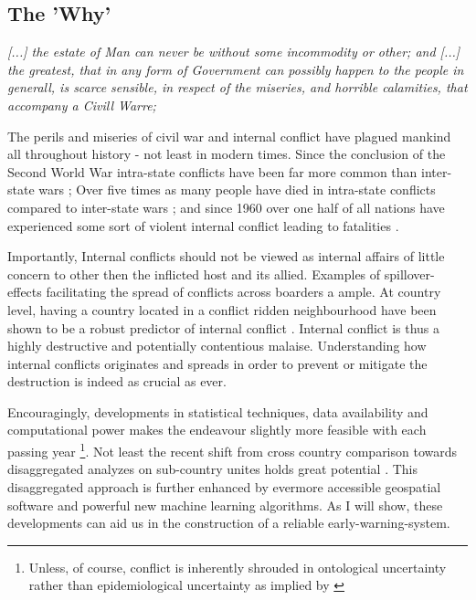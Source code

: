 \documentclass[a4paper]{article}
\begin{document}
\subsection{The 'Why'}

\begin{displayquote}
\emph{[...] the estate of Man can never be without some incommodity or other; and [...] the greatest, that in any form of Government can possibly happen to the people in generall, is scarce sensible, in respect of the miseries, and horrible calamities, that accompany a Civill Warre;} \cite[128]{Hobbes_1991} \par

\end{displayquote}

The perils and miseries of civil war and internal conflict have plagued mankind all throughout history - not least in modern times. Since the conclusion of the Second World War intra-state conflicts have been far more common than inter-state wars \citep[563]{Collier_Hoeffler_2004}; Over five times as many people have died in intra-state conflicts compared to inter-state wars \citep[563]{Collier_Hoeffler_2004}; and since 1960 over one half of all nations have experienced some sort of violent internal conflict leading to fatalities \citep[3-4]{Blattman_Miguel_2010}.\par

Importantly, Internal conflicts should not be viewed as internal affairs of little concern to other then the inflicted host and its allied. Examples of spillover-effects facilitating the spread of conflicts across boarders a ample. At country level, having a country located in a conflict ridden neighbourhood have been shown to be a robust predictor of internal conflict \citep{Hegre_Sambanis_2006,Goldstone_2010}. Internal conflict is thus a highly destructive and potentially contentious malaise. Understanding how internal conflicts originates and spreads in order to prevent or mitigate the destruction is indeed as crucial as ever.\par

Encouragingly, developments in statistical techniques, data availability and computational power makes the endeavour slightly more feasible with each passing year \footnote{Unless, of course, conflict is inherently shrouded in ontological uncertainty rather than epidemiological uncertainty as implied by \cite{Gartzke_1999}}. Not least the recent shift from cross country comparison towards disaggregated analyzes on sub-country unites holds great potential \citep{Cederman_Gleditsch_2009}. This disaggregated approach is further enhanced by evermore accessible geospatial software and powerful new machine learning algorithms. As I will show, these developments can aid us in the construction of a reliable early-warning-system.\par
\end{document}
